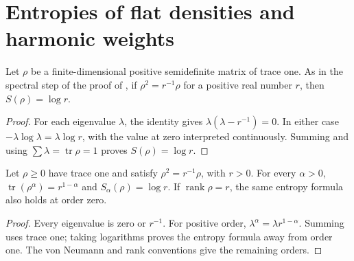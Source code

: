 \section{Entropies of flat densities and harmonic weights}

\begin{lemma}%
    \label{thm:peps_flat_density_entropy}
    \leanok
    Let $\rho$ be a finite-dimensional positive semidefinite matrix of
    trace one. As in the spectral step of the proof of
    \cite[Theorem~6.9]{Schuch2010PEPS}, if $\rho^2=r^{-1}\rho$ for a positive
    real number $r$, then $S(\rho)=\log r$.
\end{lemma}

\begin{proof}\leanok
    For each eigenvalue $\lambda$, the identity gives
    $\lambda(\lambda-r^{-1})=0$. In either case
    $-\lambda\log\lambda=\lambda\log r$, with the value at zero
    interpreted continuously. Summing and using
    $\sum\lambda=\operatorname{tr}\rho=1$ proves $S(\rho)=\log r$.
\end{proof}

\begin{lemma}%
    \label{thm:peps_flat_density_renyi_entropy}
    \leanok
    Let $\rho\geq0$ have trace one and satisfy $\rho^2=r^{-1}\rho$, with
    $r>0$. For every $\alpha>0$,
    $\operatorname{tr}(\rho^\alpha)=r^{1-\alpha}$ and
    $S_\alpha(\rho)=\log r$. If $\operatorname{rank}\rho=r$, the same
    entropy formula also holds at order zero.
\end{lemma}

\begin{proof}\leanok
    Every eigenvalue is zero or $r^{-1}$. For positive order,
    $\lambda^\alpha=\lambda r^{1-\alpha}$. Summing uses trace one;
    taking logarithms proves the entropy formula away from order one.
    The von Neumann and rank conventions give the remaining orders.
\end{proof}

